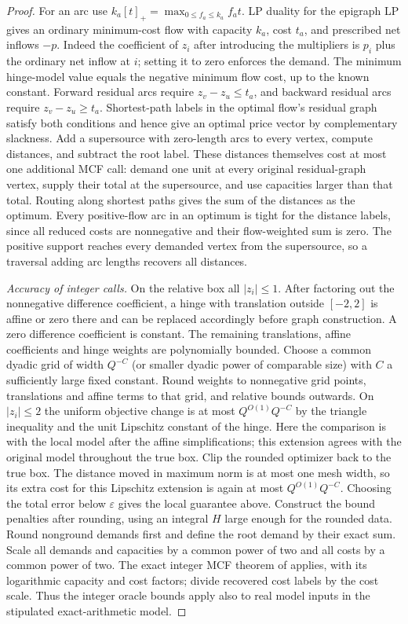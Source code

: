 \documentclass[11pt,letterpaper]{article}
\begin{document}
\begin{proof}
For an arc use $k_a[t]_+=\max_{0\le f_a\le k_a} f_a t$.
LP duality for the epigraph LP gives an ordinary minimum-cost flow with
capacity $k_a$, cost $t_a$, and prescribed net inflows $-p$. Indeed the
coefficient of $z_i$ after introducing the multipliers is $p_i$ plus the
ordinary net inflow at $i$; setting it to zero enforces the demand. The
minimum hinge-model value equals the negative minimum flow cost, up to the
known constant. Forward residual arcs require $z_v-z_u\le t_a$, and
backward residual arcs require $z_v-z_u\ge t_a$. Shortest-path labels in
the optimal flow's residual graph satisfy both conditions and hence give
an optimal price vector by complementary slackness. Add a supersource
with zero-length arcs to every vertex, compute distances, and subtract the
root label. These distances themselves cost at most one additional MCF
call: demand one unit at every original residual-graph vertex, supply
their total at the supersource, and use capacities larger than that total.
Routing along shortest paths gives the sum of the distances as the optimum.
Every positive-flow arc in an optimum is tight for the distance labels,
since all reduced costs are nonnegative and their flow-weighted sum is zero.
The positive support reaches every demanded vertex from the supersource,
so a traversal adding arc lengths recovers all distances.

\emph{Accuracy of integer calls.}
On the relative box all $|z_i|\le1$. After factoring out the nonnegative
difference coefficient, a hinge with translation outside $[-2,2]$ is
affine or zero there and can be replaced accordingly before graph
construction. A zero difference coefficient is constant. The remaining
translations, affine coefficients and hinge weights are polynomially
bounded. Choose a common dyadic grid of width $Q^{-C}$ (or smaller dyadic
power of comparable size) with $C$ a sufficiently large fixed constant.
Round weights to nonnegative grid points, translations and affine terms
to that grid, and relative bounds outwards. On $|z_i|\le2$ the uniform
objective change is at most $Q^{O(1)}Q^{-C}$ by the triangle inequality
and the unit Lipschitz constant of the hinge. Here the comparison is with
the local model after the affine simplifications; this extension agrees
with the original model throughout the true box. Clip the rounded
optimizer back to the true box. The distance moved in maximum norm is
at most one mesh width, so its extra cost for this Lipschitz extension
is again at most $Q^{O(1)}Q^{-C}$. Choosing the total error below
$\varepsilon$ gives the local guarantee above. Construct the bound
penalties after rounding, using an integral $H$ large enough for the
rounded data. Round nonground demands first and define the root demand
by their exact sum. Scale all demands and capacities by a common power
of two and all costs by a common power of two. The exact integer MCF
theorem of \cite{cklpps} applies, with its logarithmic capacity and
cost factors; divide recovered cost labels by the cost scale. Thus the
integer oracle bounds apply also to real model inputs in the stipulated
exact-arithmetic model.


\end{proof}
\end{document}
